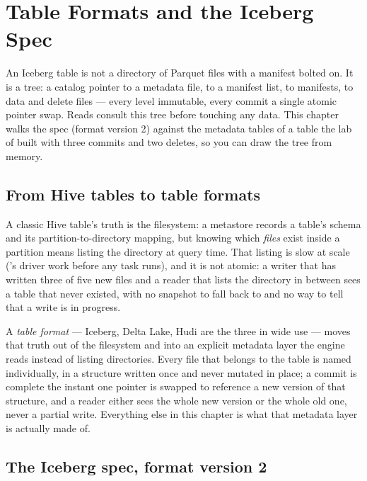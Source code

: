 \chapter{Table Formats and the Iceberg Spec}
\label{ch:iceberg-spec}

\begin{chapterintro}
An Iceberg table is not a directory of Parquet files with a manifest bolted on.
It is a tree: a catalog pointer to a metadata file, to a manifest list, to
manifests, to data and delete files --- every level immutable, every commit a
single atomic pointer swap. Reads consult this tree before touching any data.
This chapter walks the spec (format version 2) against the metadata tables of a
table the lab of  built with three commits and two deletes,
so you can draw the tree from memory.
\end{chapterintro}

\section{From Hive tables to table formats}
\label{sec:ice-from-hive}

A classic Hive table's truth is the filesystem: a metastore records a
table's schema and its partition-to-directory mapping, but knowing which
\emph{files} exist inside a partition means listing the directory at query
time. That listing is slow at scale ('s driver work
before any task runs), and it is not atomic: a writer that has written three
of five new files and a reader that lists the directory in between sees a
table that never existed, with no snapshot to fall back to and no way to tell
that a write is in progress.

A \emph{table format} --- Iceberg, Delta Lake, Hudi are the three in wide use
--- moves that truth out of the filesystem and into an explicit metadata layer
the engine reads instead of listing directories. Every file that belongs to
the table is named individually, in a structure written once and never
mutated in place; a commit is complete the instant one pointer is swapped to
reference a new version of that structure, and a reader either sees the whole
new version or the whole old one, never a partial write. Everything else in
this chapter is what that metadata layer is actually made of.

\section{The Iceberg spec, format version 2}
\label{sec:ice-spec-v2}

